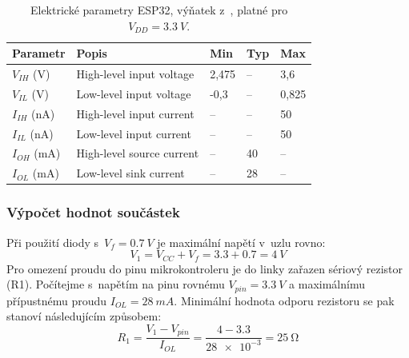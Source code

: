         \begin{table}[h]
            \centering
            \caption{Elektrické parametry ESP32, výňatek z~\cite{esp32-wroom-32e-datasheet}, platné pro \(V_{DD} =\qty{3,3}{V}\).}
            \label{tab:esp32-elektricke-parametry}
            \begin{tabular}{|l|l|l|l|l|}
            \hline
            \textbf{Parametr} & \textbf{Popis} & \textbf{Min} & \textbf{Typ} & \textbf{Max} \\ \hline\hline
            \(V_{IH}\) (V)   & High-level input voltage   & 2,475  & --  & 3,6          \\ \hline
            \(V_{IL}\) (V)   & Low-level input voltage    & -0,3 & --   & 0,825   \\ \hline
            \(I_{IH}\) (nA)  & High-level input current   & --   & --   & 50           \\ \hline
            \(I_{IL}\) (nA)  & Low-level input current    & --   & --   & 50           \\ \hline
            \(I_{OH}\) (mA)  & High-level source current  & --   & 40   & --           \\ \hline
            \(I_{OL}\) (mA)  & Low-level sink current     & --   & 28   & --           \\ \hline
            \end{tabular}
        \end{table}

        \newpage
        \subsubsection{Výpočet hodnot součástek}
            Při použití diody s~\(V_{f} =\qty{0.7}{V}\) je maximální napětí v~uzlu  rovno:
            \begin{equation}
                V_{1} =V_{CC} +V_{f} = \num{3,3}+\num{0,7}=\qty{4}{V}
            \end{equation}
            Pro omezení proudu do pinu mikrokontroleru je do linky zařazen sériový rezistor (R1). Počítejme s~napětím na pinu rovnému \(V_{pin} =\qty{3.3}{V}\) a maximálnímu přípustnému proudu \(I_{OL} =\qty{28}{mA}\). Minimální hodnota odporu rezistoru se pak stanoví následujícím způsobem:
            \begin{equation}
                R_{1} =\frac{V_{1}- V_{pin}}{I_{OL} }=\frac{\num{4}-\num{3.3}}{\num{28e-3}}=\qty{25}{\ohm}
            \end{equation}

